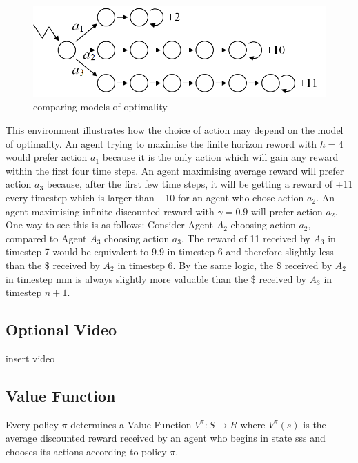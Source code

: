 \documentclass[11pt]{article}
\begin{document}
\begin{figure}[h]
    \centering
    \includegraphics[width=\textwidth]{../out/images/comparing-models-of-optimality}
    \caption[comparing models of optimality]{comparing models of optimality}
    \label{fig:comparing models of optimality}
\end{figure}

This environment illustrates how the choice of action may depend on the model
of optimality.
An agent trying to maximise the finite horizon reword with $h=4$ would prefer
action $a_1$ because it is the only action which will gain any reward within
the first four time steps.
An agent maximising average reward will prefer action $a_3$ because, after the
first few time steps, it will be getting a reward of +11 every timestep which
is larger than +10 for an agent who chose action $a_2$.
An agent maximising infinite discounted reward with $\gamma=0.9$ will prefer
action $a_2$.
One way to see this is as follows: Consider Agent $A_2$ choosing action $a_2$,
compared to Agent $A_3$ choosing action $a_3$.
The reward of 11 received by $A_3$ in timestep 7 would be equivalent to 9.9 in
timestep 6 and therefore slightly less than the \$ received by $A_2$ in
timestep 6.
By the same logic, the \$ received by $A_2$ in timestep nnn is always
slightly more valuable than the \$ received by $A_3$ in timestep  $n + 1$.

\subsection{Optional Video}\label{subsec:optional-video4}
insert video

\subsection{Value Function}\label{subsec:value-function}
Every policy $\pi$ determines a Value Function $V^{\pi}: S \to R$ where
$V^{\pi}(s)$ is the average discounted reward received by an agent who begins
in state sss and chooses its actions according to policy $\pi$.
\end{document}
